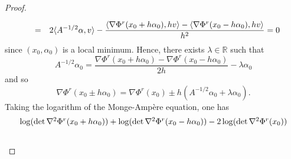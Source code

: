 \documentclass[11pt,a4paper,reqno]{amsart}
\numberwithin{equation}{section}
\theoremstyle{definition}
\newcommand{\nm}{\noalign{\smallskip}}
\newcommand{\ds}{\displaystyle}
\newcommand{\<}{\ensuremath \leq}
\renewcommand{\>}{\ensuremath \geq}
\begin{document}
\begin{proof}
$$\begin{array}{lll}
    \nm 
    &=& \ds 2\langle A^{-1/2}\alpha,v\rangle-\frac{\langle \nabla \Phi^r(x_0+h\alpha_0), hv\rangle-\langle \nabla \Phi^r(x_0-h\alpha_0),hv\rangle}{h^2}=0 \end{array}$$ since $(x_0,\alpha_0)$ is a local minimum. Hence, there exists $\lambda \in \mathbb{R}$ such that $$A^{-1/2}\alpha_0=\frac{\nabla \Phi^r(x_0+h\alpha_0)-\nabla \Phi^r(x_0-h\alpha_0)}{2h}-\lambda \alpha_0$$ and so $$\nabla \Phi^r(x_0 \pm h\alpha_0)=\nabla \Phi^r(x_0) \pm h(A^{-1/2}\alpha_0+\lambda \alpha_0).$$ Taking the logarithm of the Monge-Ampère equation, one has \begin{equation}
    \label{Monge_Amp}  \begin{array}{lll}
    \log(\det \nabla^2 \Phi^r(x_0+h\alpha_0))+\log(\det \nabla^2 \Phi^r(x_0-h\alpha_0))-2\log(\det \nabla^2 \Phi^r(x_0)) \\ \\
    \nm 
    

\end{array}
\end{equation}
\end{proof}
\end{document}
